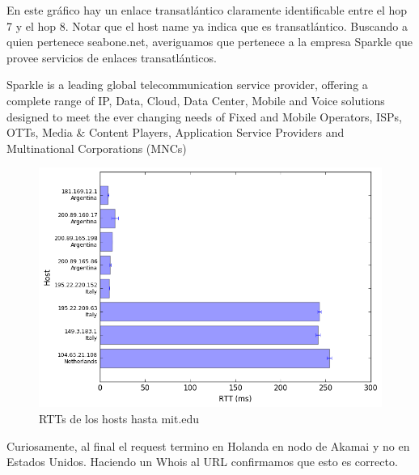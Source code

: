 En este gráfico hay un enlace transatlántico claramente identificable entre el hop 7 y el hop 8. Notar que el host name ya indica que es transatlántico. Buscando a quien pertenece seabone.net, averiguamos que pertenece a la empresa Sparkle que provee servicios de enlaces transatlánticos.

\begin{tcolorbox}
Sparkle is a leading global telecommunication service provider, offering a complete range of IP, Data, Cloud, Data Center, Mobile and Voice solutions designed to meet the ever changing needs of Fixed and Mobile Operators, ISPs, OTTs, Media \& Content Players, Application Service Providers and Multinational Corporations (MNCs)
\end{tcolorbox}

\begin{figure}[H]
\caption{RTTs de los hosts hasta mit.edu}
\includegraphics[width=\textwidth,keepaspectratio]{images/mit.png}
\end{figure}

Curiosamente, al final el request termino en Holanda en nodo de Akamai y no en Estados Unidos. Haciendo un Whois al URL confirmamos que esto es correcto.

